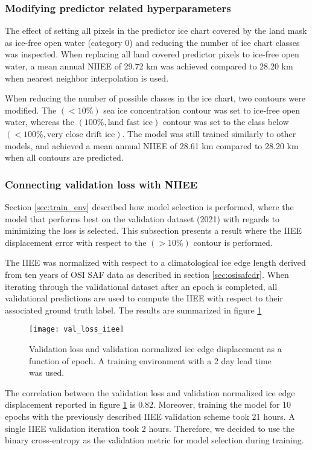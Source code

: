 \documentclass[../main/thesis]{subfiles}
\begin{document}
\subsubsection{Modifying predictor related hyperparameters}
\label{sec:modifyhyperparam}
The effect of setting all pixels in the predictor ice chart covered by the land mask as ice-free open water (category 0) and reducing the number of ice chart classes was inspected. When replacing all land covered predictor pixels to ice-free open water, a mean annual NIIEE of 29.72 km was achieved compared to 28.20 km when nearest neighbor interpolation is used. 

When reducing the number of possible classes in the ice chart, two contours were modified. The $(< 10\%)$ sea ice concentration contour was set to ice-free open water, whereas the $(100\%, \text{land fast ice})$ contour was set to the class below $(< 100\%, \text{very close drift ice})$. The model was still trained similarly to other models, and achieved a mean annual NIIEE of 28.61 km compared to 28.20 km when all contours are predicted.  

\subsubsection{Connecting validation loss with NIIEE}
\label{sec:connecting_val_loss_with_NIIEE}
Section \ref{sec:train_env} described how model selection is performed, where the model that performs best on the validation dataset (2021) with regards to minimizing the loss is selected. This subsection presents a result where the IIEE displacement error \citep{Goessling2016, Melsom2019} with respect to the $(>10\%)$ contour is performed. 

The IIEE was normalized with respect to a climatological ice edge length derived from ten years of OSI SAF data as described in section \ref{sec:osisafcdr}. When iterating through the validational dataset after an epoch is completed, all validational predictions are used to compute the IIEE with respect to their associated ground truth label. The results are summarized in figure \ref{fig:val_loss_iiee}

\begin{figure}
    \centering
    \texttt{[image: val\_loss\_iiee]}
    \caption{\label{fig:val_loss_iiee}Validation loss and validation normalized ice edge displacement as a function of epoch. A training environment with a 2 day lead time was used.}
\end{figure}

The correlation between the validation loss and validation normalized ice edge displacement reported in figure \ref{fig:val_loss_iiee} is 0.82. Moreover, training the model for 10 epochs with the previously described IIEE validation scheme took 21 hours. A single IIEE validation iteration took 2 hours. Therefore, we decided to use the binary cross-entropy as the validation metric for model selection during training.

\biblio
\end{document}
